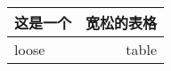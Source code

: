 \documentclass[nofonts]{ctexart}
\begin{document}
\begin{tabular}{|l|r|}
	\hline
	这是一个	& 宽松的表格	\\
	\hline
	loose		& table			\\
	\hline
\end{tabular}
\end{document}
